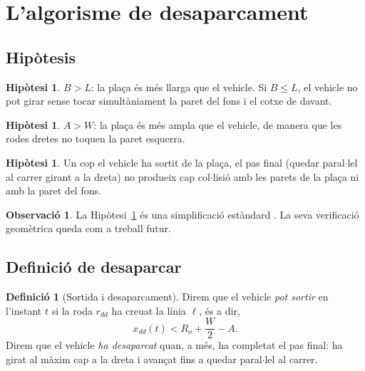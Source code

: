 \documentclass[11pt, a4paper]{article}
\theoremstyle{plain}
\theoremstyle{definition}
\newtheorem{definition}[theorem]{Definici\'o}
\newtheorem{remark}[theorem]{Observaci\'o}
\newtheorem{hypothesis}[theorem]{Hip\`otesi}
\newcommand{\Ro}{R_o}
\begin{document}
\section{L'algorisme de desaparcament}\label{sec:algorisme}

\subsection{Hip\`otesis}

\begin{hypothesis}\label{hyp:B}
$B > L$: la pla\c{c}a \'es m\'es llarga que el vehicle. Si $B\leq L$, el
vehicle no pot girar sense tocar simult\`aniament la paret del fons i el
cotxe de davant.
\end{hypothesis}

\begin{hypothesis}\label{hyp:A}
$A > W$: la pla\c{c}a \'es m\'es ampla que el vehicle, de manera que les
rodes dretes no toquen la paret esquerra.
\end{hypothesis}

\begin{hypothesis}\label{hyp:carril}
Un cop el vehicle ha sortit de la pla\c{c}a, el pas final (quedar
paral$\cdot$lel al carrer girant a la dreta) no produeix cap col$\cdot$lisi\'o
amb les parets de la pla\c{c}a ni amb la paret del fons.
\end{hypothesis}

\begin{remark}
La Hip\`otesi~\ref{hyp:carril} \'es una simplificaci\'o est\`andard
\cite{Vorobieva2012}. La seva verificaci\'o geom\`etrica queda com a treball
futur.
\end{remark}

\subsection{Definici\'o de desaparcar}

\begin{definition}[Sortida i desaparcament]\label{def:sortida}
Direm que el vehicle \emph{pot sortir} en l'instant $t$ si la roda $r_{dd}$
ha creuat la l\'inia $\ell$, \'es a dir,
\[
  x_{dd}(t) < \Ro + \frac{W}{2} - A.
\]
Direm que el vehicle \emph{ha desaparcat} quan, a m\'es, ha completat el
pas final: ha girat al m\`axim cap a la dreta i avan\c{c}at fins a quedar
paral$\cdot$lel al carrer.
\end{definition}
\end{document}

